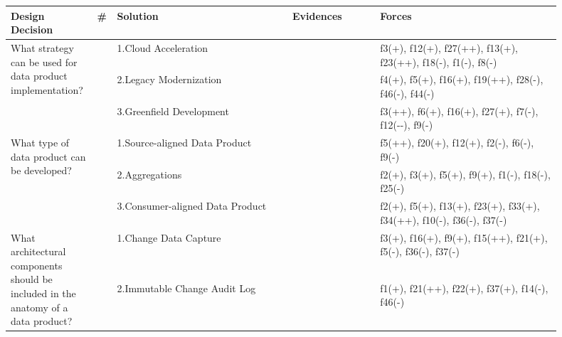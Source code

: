 \begin{tabular}{|p{0.12\linewidth}|p{0.015\linewidth}|p{0.3\linewidth}|p{0.15\linewidth}|p{0.31\linewidth}|}
\hline
{\bf Design Decision} & {\bf \#} & {\bf Solution} & {\bf Evidences} & {\bf Forces}\\
\hline
\multirow{3}{\linewidth}{What strategy can be used for data product implementation?} &\cellcolor{emerald_shape_6}{} &1.Cloud Acceleration&\cellcolor{emerald_shape_2}{s4, s47, p2, p8} & f3(+), f12(+), f27(++), f13(+), f23(++), f18(-), f1(-), f8(-)\\
 & \cellcolor{emerald_shape_6}{} & 2.Legacy Modernization&\cellcolor{emerald_shape_2}{s4, p1, p2, p3} & f4(+), f5(+), f16(+), f19(++), f28(-), f46(-), f44(-)\\
 & \multirow{-3}{\linewidth}{ \cellcolor{emerald_shape_6}{43}} &3.Greenfield Development&\cellcolor{emerald_shape_7}{s1, s2, s3, s5, s6, s7, s8, s9, s11, s14, s15, s18, s20, s23, s25, s28, s30, s31, s32, s33, s35, s37, s38, s39, s40, s41, s42, s43, s45, s49, p1, p2, p3} & f3(++), f6(+), f16(+), f27(+), f7(-), f12(-{}-), f9(-)\\
\multirow{3}{\linewidth}{What type of data product can be developed?} &\cellcolor{emerald_shape_5}{} &1.Source-aligned Data Product&\cellcolor{emerald_shape_5}{s4, s7, s8, s23, s38, s42, s44, s49, s52, s57, p5, p8} & f5(++), f20(+), f12(+), f2(-), f6(-), f9(-)\\
 & \cellcolor{emerald_shape_5}{} & 2.Aggregations&\cellcolor{emerald_shape_5}{s3, s5, s7, s8, s15, s21, s23, s42, s43, s49, s52, p1, p3, p5, p8} & f2(+), f3(+), f5(+), f9(+), f1(-), f18(-), f25(-)\\
 & \multirow{-3}{\linewidth}{ \cellcolor{emerald_shape_5}{31}} &3.Consumer-aligned Data Product&\cellcolor{emerald_shape_5}{s4, s7, s8, s23, s38, s42, s44, s49, s52, s57, p1, p5, p8} & f2(+), f5(+), f13(+), f23(+), f33(+), f34(++), f10(-), f36(-), f37(-)\\
\multirow{8}{\linewidth}{What architectural components should be included in the anatomy of a data product?} &\cellcolor{emerald_shape_7}{} &1.Change Data Capture&\cellcolor{emerald_shape_4}{s4, s17, s20, s38, s45, s48, s53, s54, s55, s56, p2, p3, p10} & f3(+), f16(+), f9(+), f15(++), f21(+), f5(-), f36(-), f37(-)\\
 & \cellcolor{emerald_shape_7}{} & 2.Immutable Change Audit Log&\cellcolor{emerald_shape_5}{s4, s8, s12, s31, s32, s35, s36, s45, s47, s48, s53, s54, s55, s56, s57, p1, p2, p3, p4, p7} & f1(+), f21(++), f22(+), f37(+), f14(-), f46(-)\\

\end{tabular}
